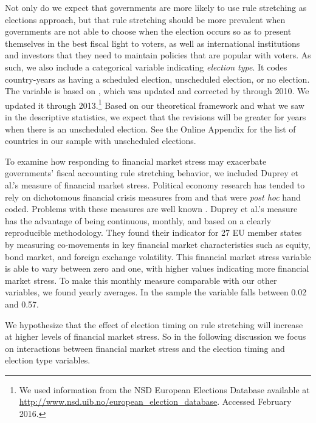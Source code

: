 \documentclass[]{article}
\begin{document}
Not only do we expect that governments are more likely to use rule stretching as elections approach, but that rule stretching should be more prevalent when governments are not able to choose when the election occurs so as to present themselves in the best fiscal light to voters, as well as international institutions and investors that they need to maintain policies that are popular with voters. As such, we also include a categorical variable indicating \emph{election type}. It codes country-years as having a scheduled election, unscheduled election, or no election. The variable is based on \cite{Brender2008}, which was updated and corrected by \cite{hallerbergWehner2015} through 2010. We updated it through 2013.\footnote{We used information from the NSD European Elections Database available at \url{http://www.nsd.uib.no/european_election_database}. Accessed February 2016.} Based on our theoretical framework and what we saw in the descriptive statistics, we expect that the revisions will be greater for years when there is an unscheduled election. See the Online Appendix for the list of countries in our sample with unscheduled elections.

To examine how responding to financial market stress may exacerbate governments' fiscal accounting rule stretching behavior, we included Duprey et al.'s \citeyearpar{ThibautDuprey2015} measure of financial market stress. Political economy research has tended to rely on dichotomous financial crisis measures from \cite{Laeven2012} and \cite{ReinhartRog2010} that were \emph{post hoc} hand coded. Problems with these measures are well known \citep[see][]{finstress_paper}. Duprey et al.'s measure has the advantage of being continuous, monthly, and based on a clearly reproducible methodology. They found their indicator for 27 EU member states by measuring co-movements in key financial market characteristics such as equity, bond market, and foreign exchange volatility. This financial market stress variable is able to vary between zero and one, with higher values indicating more financial market stress. To make this monthly measure comparable with our other variables, we found yearly averages. In the sample the variable falls between 0.02 and 0.57.

We hypothesize that the effect of election timing on rule stretching will increase at higher levels of financial market stress. So in the following discussion we focus on interactions between financial market stress and the election timing and election type variables.
\end{document}
